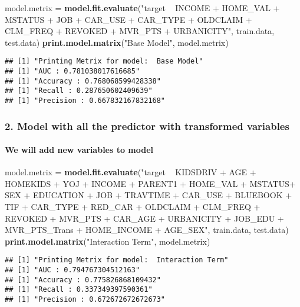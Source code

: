 \documentclass[]{article}
\newenvironment{Shaded}{\begin{snugshade}}{\end{snugshade}}
\newcommand{\KeywordTok}[1]{\textcolor[rgb]{0.13,0.29,0.53}{\textbf{#1}}}
\newcommand{\NormalTok}[1]{#1}
\newcommand{\StringTok}[1]{\textcolor[rgb]{0.31,0.60,0.02}{#1}}
\let\oldparagraph\paragraph
\renewcommand{\paragraph}[1]{\oldparagraph{#1}\mbox{}}
\begin{document}
\begin{Shaded}
\begin{Highlighting}[]
\NormalTok{model.metrix =}\StringTok{ }\KeywordTok{model.fit.evaluate}\NormalTok{(}\StringTok{"target ~ INCOME + HOME_VAL + MSTATUS  + JOB + CAR_USE + CAR_TYPE + OLDCLAIM + CLM_FREQ + REVOKED + MVR_PTS + URBANICITY"}\NormalTok{, train.data, test.data)}
\KeywordTok{print.model.matrix}\NormalTok{(}\StringTok{"Base Model"}\NormalTok{, model.metrix)}
\end{Highlighting}
\end{Shaded}

\begin{verbatim}
## [1] "Printing Metrix for model:  Base Model"
## [1] "AUC : 0.781038017616685"
## [1] "Accuracy : 0.768068599428338"
## [1] "Recall : 0.287650602409639"
## [1] "Precision : 0.667832167832168"
\end{verbatim}

\hypertarget{model-with-all-the-predictor-with-transformed-variables}{%
\subsubsection{\texorpdfstring{\textbf{2. Model with all the predictor
with transformed
variables}}{2. Model with all the predictor with transformed variables}}\label{model-with-all-the-predictor-with-transformed-variables}}

\hypertarget{we-will-add-new-variables-to-model}{%
\paragraph{We will add new variables to
model}\label{we-will-add-new-variables-to-model}}

\begin{Shaded}
\begin{Highlighting}[]
\NormalTok{model.metrix =}\StringTok{ }\KeywordTok{model.fit.evaluate}\NormalTok{(}\StringTok{"target ~ KIDSDRIV + AGE + HOMEKIDS + YOJ + INCOME + PARENT1 + HOME_VAL + MSTATUS+ SEX + EDUCATION + JOB + TRAVTIME + CAR_USE + BLUEBOOK  + TIF + CAR_TYPE + RED_CAR + OLDCLAIM + CLM_FREQ + REVOKED + MVR_PTS + CAR_AGE + URBANICITY + JOB_EDU + MVR_PTS_Trans + HOME_INCOME + AGE_SEX"}\NormalTok{, train.data, test.data)}
\KeywordTok{print.model.matrix}\NormalTok{(}\StringTok{"Interaction Term"}\NormalTok{, model.metrix)}
\end{Highlighting}
\end{Shaded}

\begin{verbatim}
## [1] "Printing Metrix for model:  Interaction Term"
## [1] "AUC : 0.794767304512163"
## [1] "Accuracy : 0.775826868109432"
## [1] "Recall : 0.337349397590361"
## [1] "Precision : 0.672672672672673"
\end{verbatim}
\end{document}
